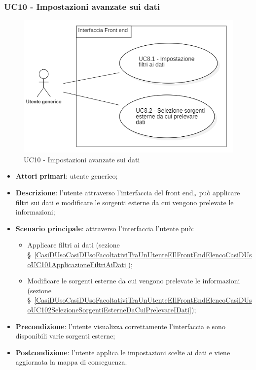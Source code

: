 \subsubsection{UC10 - Impostazioni avanzate sui dati}\label{CasiDUsoCasiDUsoFacoltativiTraUnUtenteEIlFrontEndElencoCasiDUsoUC10ImpostazioniAvanzateSuiDati}
\begin{center}
	\begin{figure}[H]
		\includegraphics[scale=0.7]{../immagini/attori_casi/uc8.png}
		\caption{UC10 - Impostazioni avanzate sui dati}
	\end{figure}
\end{center}
\begin{itemize}
	\item \textbf{Attori primari}: utente generico;
	\item \textbf{Descrizione}: l'utente attraverso l'interfaccia del front end$_{\scaleto{G}{3pt}}$ può applicare filtri sui dati e modificare le sorgenti esterne da cui vengono prelevate le informazioni;
	\item \textbf{Scenario principale}: attraverso l'interfaccia l'utente può:
	\begin{itemize}
		\item Applicare filtri ai dati (sezione  \S~\ref{CasiDUsoCasiDUsoFacoltativiTraUnUtenteEIlFrontEndElencoCasiDUsoUC101ApplicazioneFiltriAiDati});
		\item Modificare le sorgenti esterne da cui vengono prelevate le informazioni (sezione \S~\ref{CasiDUsoCasiDUsoFacoltativiTraUnUtenteEIlFrontEndElencoCasiDUsoUC102SelezioneSorgentiEsterneDaCuiPrelevareIDati});
	\end{itemize}
	\item \textbf{Precondizione}: l'utente visualizza correttamente l'interfaccia e sono disponibili varie sorgenti esterne;
	\item \textbf{Postcondizione}: l'utente applica le impostazioni scelte ai dati e viene aggiornata la mappa di conseguenza. 
\end{itemize}

